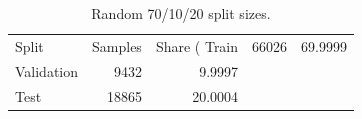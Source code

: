 \begin{table}
\caption{Random 70/10/20 split sizes.}
\label{tab:random_split}
\begin{tabular}{lrr}
\toprule
Split & Samples & Share (%
\midrule
Train & 66026 & 69.9999 \\
Validation & 9432 & 9.9997 \\
Test & 18865 & 20.0004 \\
\bottomrule
\end{tabular}
\end{table}
